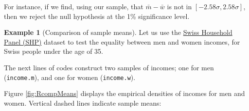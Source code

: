 \documentclass[
  12pt,
]{book}
\newenvironment{Shaded}{\begin{snugshade}}{\end{snugshade}}
\newcommand{\CommentTok}[1]{\textcolor[rgb]{0.56,0.35,0.01}{\textit{#1}}}
\newcommand{\DecValTok}[1]{\textcolor[rgb]{0.00,0.00,0.81}{#1}}
\newcommand{\FunctionTok}[1]{\textcolor[rgb]{0.00,0.00,0.00}{#1}}
\newcommand{\NormalTok}[1]{#1}
\newcommand{\OtherTok}[1]{\textcolor[rgb]{0.56,0.35,0.01}{#1}}
\newcommand{\SpecialCharTok}[1]{\textcolor[rgb]{0.00,0.00,0.00}{#1}}
\theoremstyle{definition}
\theoremstyle{definition}
\newtheorem{example}{Example}[chapter]
\theoremstyle{definition}
\theoremstyle{definition}
\theoremstyle{remark}
\begin{document}
For instance, if we find, using our sample, that \(\bar{m} - \bar{w}\) is not in \([-2.58\sigma,2.58\sigma]\), then we reject the null hypothesis at the 1\% significance level.

\begin{example}[Comparison of sample means]
\protect\hypertarget{exm:comparSmplMeans}{}\label{exm:comparSmplMeans}Let us use the \href{https://forscenter.ch/projects/swiss-household-panel/}{Swiss Household Panel (SHP)} dataset to test the equality between men and women incomes, for Swiss people under the age of 35.

The next lines of codes construct two samples of incomes; one for men (\texttt{income.m}), and one for women (\texttt{income.w}).

\begin{Shaded}
\end{Shaded}

Figure \ref{fig:RcompMeans} displays the empirical densities of incomes for men and women. Vertical dashed lines indicate sample means:


\end{example}
\end{document}
